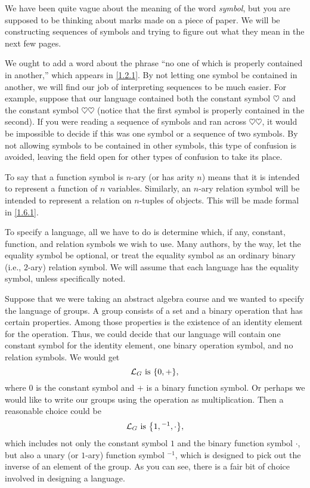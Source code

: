 \begin{note}
  We have been quite vague about the meaning of the word \emph{symbol}, but you are supposed to be thinking about marks made on a piece of paper.
  We will be constructing sequences of symbols and trying to figure out what they mean in the next few pages.

  We ought to add a word about the phrase ``no one of which is properly contained in another,'' which appears in \cref{1.2.1}.
  By not letting one symbol be contained in another, we will find our job of interpreting sequences to be much easier.
  For example, suppose that our language contained both the constant symbol \(\heartsuit\) and the constant symbol \(\heartsuit\heartsuit\)
  (notice that the first symbol is properly contained in the second).
  If you were reading a sequence of symbols and ran across \(\heartsuit\heartsuit\), it would be impossible to decide if this was one symbol or a sequence of two symbols.
  By not allowing symbols to be contained in other symbols, this type of confusion is avoided, leaving the field open for other types of confusion to take its place.

  To say that a function symbol is \(n\)-ary (or has arity \(n\)) means that it is intended to represent a function of \(n\) variables.
  Similarly, an \(n\)-ary relation symbol will be intended to represent a relation on \(n\)-tuples of objects.
  This will be made formal in \cref{1.6.1}.

  To specify a language, all we have to do is determine which, if any, constant, function, and relation symbols we wish to use.
  Many authors, by the way, let the equality symbol be optional, or treat the equality symbol as an ordinary binary (i.e., \(2\)-ary) relation symbol.
  We will assume that each language has the equality symbol, unless specifically noted.
\end{note}

\begin{eg}\label{1.2.2}
  Suppose that we were taking an abstract algebra course and we wanted to specify the language of groups.
  A group consists of a set and a binary operation that has certain properties.
  Among those properties is the existence of an identity element for the operation.
  Thus, we could decide that our language will contain one constant symbol for the identity element, one binary operation symbol, and no relation symbols.
  We would get
  \[
    \Lc_G \text{ is } \set{0, +},
  \]
  where \(0\) is the constant symbol and \(+\) is a binary function symbol.
  Or perhaps we would like to write our groups using the operation as multiplication.
  Then a reasonable choice could be
  \[
    \Lc_G \text{ is } \set{1, {}^{-1}, \cdot},
  \]
  which includes not only the constant symbol \(1\) and the binary function symbol \(\cdot\), but also a unary (or \(1\)-ary) function symbol \({}^{-1}\), which is designed to pick out the inverse of an element of the group.
  As you can see, there is a fair bit of choice involved in designing a language.
\end{eg}

